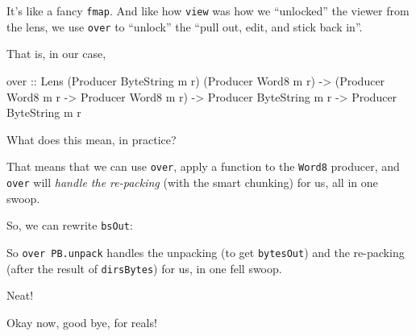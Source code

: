 \documentclass[]{article}
\newenvironment{Shaded}{}{}
\newcommand{\DataTypeTok}[1]{\textcolor[rgb]{0.56,0.13,0.00}{#1}}
\newcommand{\FunctionTok}[1]{\textcolor[rgb]{0.02,0.16,0.49}{#1}}
\newcommand{\NormalTok}[1]{#1}
\newcommand{\OperatorTok}[1]{\textcolor[rgb]{0.40,0.40,0.40}{#1}}
\newcommand{\OtherTok}[1]{\textcolor[rgb]{0.00,0.44,0.13}{#1}}
\begin{document}
It's like a fancy \texttt{fmap}. And like how \texttt{view} was how we
``unlocked'' the viewer from the lens, we use \texttt{over} to ``unlock'' the
``pull out, edit, and stick back in''.

That is, in our case,

\begin{Shaded}
\begin{Highlighting}[]
\OtherTok{over ::} \DataTypeTok{Lens\textquotesingle{}}\NormalTok{ (}\DataTypeTok{Producer} \DataTypeTok{ByteString}\NormalTok{ m r) (}\DataTypeTok{Producer} \DataTypeTok{Word8}\NormalTok{ m r)}
     \OtherTok{{-}\textgreater{}}\NormalTok{ (}\DataTypeTok{Producer} \DataTypeTok{Word8}\NormalTok{ m r }\OtherTok{{-}\textgreater{}} \DataTypeTok{Producer} \DataTypeTok{Word8}\NormalTok{ m r)}
     \OtherTok{{-}\textgreater{}} \DataTypeTok{Producer} \DataTypeTok{ByteString}\NormalTok{ m r}
     \OtherTok{{-}\textgreater{}} \DataTypeTok{Producer} \DataTypeTok{ByteString}\NormalTok{ m r}
\end{Highlighting}
\end{Shaded}

What does this mean, in practice?

That means that we can use \texttt{over}, apply a function to the \texttt{Word8}
producer, and \texttt{over} will \emph{handle the re-packing} (with the smart
chunking) for us, all in one swoop.

So, we can rewrite \texttt{bsOut}:

\begin{Shaded}
\end{Shaded}

So \texttt{over\ PB.unpack} handles the unpacking (to get \texttt{bytesOut}) and
the re-packing (after the result of \texttt{dirsBytes}) for us, in one fell
swoop.

Neat!

Okay now, good bye, for reals!
\end{document}
